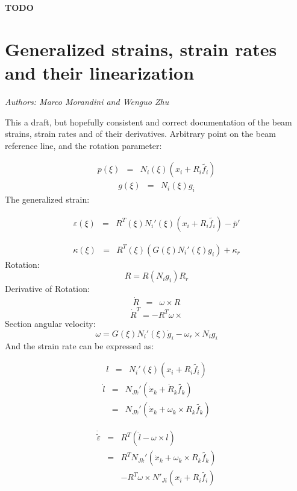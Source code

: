 \textbf{TODO}
\section{Generalized strains, strain rates and their linearization}
\emph{Authors: Marco Morandini and Wenguo Zhu}

This a draft, but hopefully consistent and correct documentation of
the beam strains, strain rates and of their derivatives. Arbitrary
point on the beam reference line, and the rotation parameter:

\begin{eqnarray*}
p(\xi) & = & N_{i}(\xi)(x_{i}+R_{i}\tilde{f_{i}})
\end{eqnarray*}
\begin{eqnarray*}
g(\xi) & = & N_{i}(\xi)g_{i}
\end{eqnarray*}
The generalized strain: 

\begin{eqnarray*}
\varepsilon(\xi) & = & R^{T}(\xi)N_{i}'(\xi)(x_{i}+R_{i}\tilde{f_{i}})-\bar{p}'
\end{eqnarray*}

\begin{eqnarray*}
\kappa(\xi) & = & R^{T}(\xi)\left(G(\xi)N_{i}'(\xi)g_{i}\right)+\kappa_{r}
\end{eqnarray*}
Rotation:
\[
R=R(N_{i}g_{i})R_{r}
\]
Derivative of Rotation:
\begin{eqnarray*}
\dot{R} & = & \omega\times R
\end{eqnarray*}
\[
\dot{R}^{T}=-R^{T}\omega\times
\]
Section angular velocity:
\[
\omega=G(\xi)N_{i}'(\xi)\dot{g}_{i}-\omega_{r}\times N_{i}g_{i}
\]
And the strain rate can be expressed as:

\begin{eqnarray*}
l & = & N_{i}'(\xi)(x_{i}+R_{i}\tilde{f_{i}})
\end{eqnarray*}
\begin{eqnarray*}
\dot{l} & = & N_{Jk}'(\dot{x}_{k}+\dot{R}_{k}\tilde{f_{k}})\\
 & = & N_{Jk}'(\dot{x}_{k}+\omega_{k}\times R_{k}\tilde{f_{k}})
\end{eqnarray*}

\begin{eqnarray*}
\dot{\tilde{\varepsilon}} & = & R^{T}(\dot{l}-\omega\times l)\\
 & = & R^{T}N_{Jk}'(\dot{x}_{k}+\omega_{k}\times R_{k}\tilde{f_{k}})\\
 &  & -R^{T}\omega\times N'_{Ji}(x_{i}+R_{i}\tilde{f_{i}})
\end{eqnarray*}

